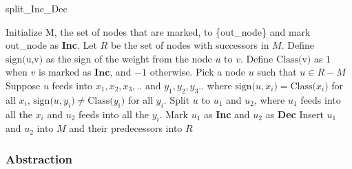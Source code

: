 \begin{algorithm}[H]
    \caption{split\_Inc\_Dec}
    \begin{algorithmic}[1]
        \State Initialize M, the set of nodes that are marked, to \{out\_node\} and mark out\_node as \textbf{Inc}.
        \State Let $R$ be the set of nodes with successors in $M$.
        \State Define $\text{sign(u,v)}$ as the sign of the weight from the node $u$ to $v$.
        \State Define $\text{Class(v)}$ as $1$ when $v$ is marked as $\textbf{Inc}$, and $-1$ otherwise.
        \State Pick a node $u$ such that $u \in R-M$
        \State Suppose $u$ feeds into $x_1,x_2,x_3,..$ and $y_1,y_2,y_3..$ where $\text{sign($u,x_i$)} = \text{Class($x_i$)}$ for all $x_i$, $\text{sign($u,y_i$)} \neq \text{Class($y_i$)}$ for all $y_i$.
        \State Split $u$ to $u_1$ and $u_2$, where $u_1$ feeds into all the $x_i$ and $u_2$ feeds into all the $y_i$.
        \State Mark $u_1$ as \textbf{Inc} and $u_2$ as \textbf{Dec}
        \State Insert $u_1$ and $u_2$ into $M$ and their predecessors into $R$
        \EndWhile
        \end{algorithmic}
\end{algorithm}


\subsubsection{Abstraction}

